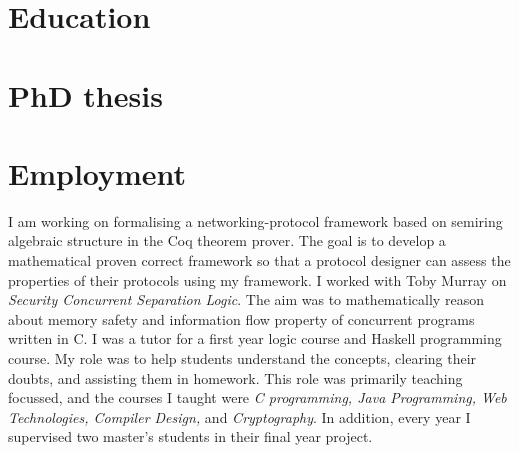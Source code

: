 \documentclass[11pt,a4paper,sans]{moderncv}        %
\begin{document}
\makecvtitle

\section{Education}

\section{PhD thesis}
\section{Employment}
  {I am working on formalising a networking-protocol framework based on semiring algebraic structure in 
  the Coq theorem prover. The goal is to develop a mathematical 
  proven correct framework so that a protocol 
  designer can assess the properties of their protocols using my framework.}
  {I worked with Toby Murray  on \textit{Security Concurrent Separation Logic}. 
  The aim was 
  to mathematically reason about memory safety and information flow property of concurrent programs written in C.}
  {I was a tutor for a first year logic course and Haskell programming course. My role was to 
  help students understand the concepts, clearing their doubts, and assisting them in homework.}
{This role was primarily teaching focussed, and 
the courses I taught were \textit{C programming, Java Programming, Web Technologies, 
Compiler Design,} and \textit{Cryptography}.  
In addition,  every year I supervised two master's students in their final year project.}
\end{document}
